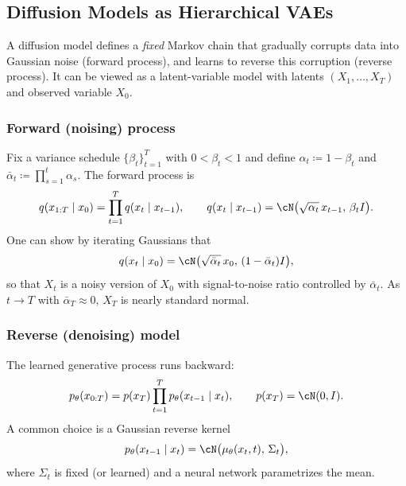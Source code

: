 \subsection{Diffusion Models as Hierarchical VAEs}
\label{sec:diffusion}

A diffusion model defines a \emph{fixed} Markov chain that gradually corrupts data into Gaussian noise (forward process), and learns to reverse this corruption (reverse process).
It can be viewed as a latent-variable model with latents $(X_1,\dots,X_T)$ and observed variable $X_0$.

\subsubsection*{Forward (noising) process}

Fix a variance schedule $\{\beta_t\}_{t=1}^T$ with $0<\beta_t<1$ and define $\alpha_t\coloneqq 1-\beta_t$ and $\bar\alpha_t\coloneqq \prod_{s=1}^t \alpha_s$.
The forward process is
\begin{equation}
    q(x_{1:T}\mid x_0)=\prod_{t=1}^T q(x_t\mid x_{t-1}),
    \qquad
    q(x_t\mid x_{t-1}) = \cN\bigl(\sqrt{\alpha_t}\,x_{t-1},\,\beta_t I\bigr).
\end{equation}
One can show by iterating Gaussians that
\begin{equation}
\label{eq:xt-given-x0}
    q(x_t\mid x_0) = \cN\bigl(\sqrt{\bar\alpha_t}\,x_0,\,(1-\bar\alpha_t)I\bigr),
\end{equation}
so that $X_t$ is a noisy version of $X_0$ with signal-to-noise ratio controlled by $\bar\alpha_t$.
As $t\to T$ with $\bar\alpha_T\approx 0$, $X_T$ is nearly standard normal.

\subsubsection*{Reverse (denoising) model}

The learned generative process runs backward:
\begin{equation}
    p_\theta(x_{0:T}) = p(x_T)\prod_{t=1}^T p_\theta(x_{t-1}\mid x_t),
    \qquad p(x_T)=\cN(0,I).
\end{equation}
A common choice is a Gaussian reverse kernel
\begin{equation}
    p_\theta(x_{t-1}\mid x_t)=\cN\bigl(\mu_\theta(x_t,t),\,\Sigma_t\bigr),
\end{equation}
where $\Sigma_t$ is fixed (or learned) and a neural network parametrizes the mean.

